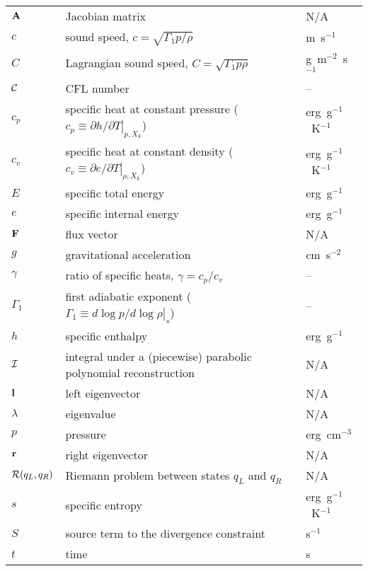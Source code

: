 \begin{center}
\begin{longtable}{|l|p{4.0in}|l|}
\hline 
\endlastfoot
${\bf A}$     & Jacobian matrix  & N/A \\
%
$c$     & sound speed, $c = \sqrt{\Gamma_1 p/\rho}$  & m~s$^{-1}$ \\
%
$C$       & Lagrangian sound speed, $C = \sqrt{\Gamma_1 p \rho}$ & g~m$^{-2}$~s$^{-1}$\\
%
${\mathcal{C}}$    & CFL number & --\\
%
$c_p$   & specific heat at constant pressure
          ($c_p \equiv \left . \partial h / \partial T \right |_{p,X_k}$)
        & erg~g$^{-1}$~K$^{-1}$ \\
%
$c_v$   & specific heat at constant density
          ($c_v \equiv \left . \partial e / \partial T \right |_{\rho,X_k}$)
        & erg~g$^{-1}$~K$^{-1}$ \\
%
$E$     & specific total energy                      & erg~g$^{-1}$ \\
%
$e$     & specific internal energy                   & erg~g$^{-1}$ \\
%
${\bf F}$     & flux vector                                & N/A \\
%
$g$     & gravitational acceleration                 & cm~s$^{-2}$ \\
%
$\gamma$ & ratio of specific heats, $\gamma = c_p/c_v$ & -- \\
%
$\Gamma_1$ & first adiabatic exponent ($\Gamma_1 \equiv \left . d \log p/d \log \rho \right |_s$) & -- \\
%
$h$     & specific enthalpy                          & erg~g$^{-1}$ \\
%
${\mathcal{I}}$   & integral under a (piecewise) parabolic polynomial reconstruction & N/A \\
%
${\bf l}$     & left eigenvector                           & N/A \\
%
$\lambda$ & eigenvalue                               & N/A \\
% 
$p$     & pressure                                   & erg~cm$^{-3}$ \\
%
${\bf r}$     & right eigenvector                          & N/A \\
%
${\mathcal{R}}(q_L, q_R)$ & Riemann problem between states $q_L$ and $q_R$ & N/A \\
%
$s$     & specific entropy                           & erg~g$^{-1}$~K$^{-1}$ \\
%
$S$     & source term to the divergence constraint   & s$^{-1}$ \\
%
$t$     & time                                       & s \\

\end{longtable}
\end{center}
